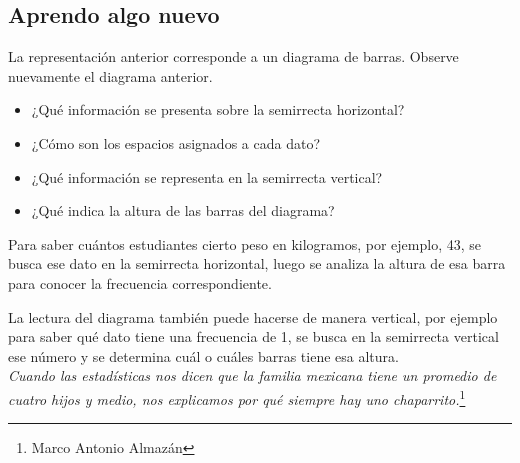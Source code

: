 \documentclass[10pt,twoside]{article}
\begin{document}
\subsection*{Aprendo algo nuevo}

La representación anterior corresponde a un diagrama de barras. Observe nuevamente el diagrama anterior.
\begin{itemize}
\item ¿Qué información se presenta sobre la semirrecta horizontal?
\item ¿Cómo son los espacios asignados a cada dato?
\item ¿Qué información se representa en la semirrecta vertical? 
\item ¿Qué indica la altura de las barras del diagrama?
\end{itemize}
Para saber cuántos estudiantes cierto peso en kilogramos, por ejemplo, 43, se busca ese dato en la semirrecta horizontal, luego se analiza la altura de esa barra para conocer la frecuencia correspondiente.

La lectura del diagrama también puede hacerse de manera vertical, por ejemplo para saber qué dato tiene una frecuencia de 1, se busca en la semirrecta vertical ese número y se determina cuál o cuáles barras tiene esa altura.\\

\emph{Cuando las estadísticas nos dicen que la familia mexicana tiene un promedio de cuatro hijos y medio, nos explicamos por qué siempre hay uno chaparrito.}\footnote{Marco Antonio Almazán}
\end{document}
